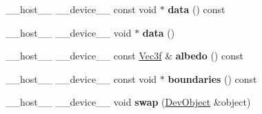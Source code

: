 \begin{DoxyCompactItemize}
\item 
\+\_\+\+\_\+host\+\_\+\+\_\+ \+\_\+\+\_\+device\+\_\+\+\_\+ const void $\ast$ {\bfseries data} () const\hypertarget{class_dev_object_a5533321471ee0ee776e30594ed48379f}{}\label{class_dev_object_a5533321471ee0ee776e30594ed48379f}

\item 
\+\_\+\+\_\+host\+\_\+\+\_\+ \+\_\+\+\_\+device\+\_\+\+\_\+ void $\ast$ {\bfseries data} ()\hypertarget{class_dev_object_a5335f7fb1dd5d15622aff5a8e9b0dc12}{}\label{class_dev_object_a5335f7fb1dd5d15622aff5a8e9b0dc12}

\item 
\+\_\+\+\_\+host\+\_\+\+\_\+ \+\_\+\+\_\+device\+\_\+\+\_\+ const \hyperlink{class_vec3}{Vec3f} \& {\bfseries albedo} () const\hypertarget{class_dev_object_ac4d2c0fc90a7be3085697e914bacc4d8}{}\label{class_dev_object_ac4d2c0fc90a7be3085697e914bacc4d8}

\item 
\+\_\+\+\_\+host\+\_\+\+\_\+ \+\_\+\+\_\+device\+\_\+\+\_\+ const void $\ast$ {\bfseries boundaries} () const\hypertarget{class_dev_object_a588ddd69ed74bc886b89fd4864024732}{}\label{class_dev_object_a588ddd69ed74bc886b89fd4864024732}

\item 
\+\_\+\+\_\+host\+\_\+\+\_\+ \+\_\+\+\_\+device\+\_\+\+\_\+ void {\bfseries swap} (\hyperlink{class_dev_object}{Dev\+Object} \&object)\hypertarget{class_dev_object_a56cf3cfc311cfe04da3b45f80e36625e}{}\label{class_dev_object_a56cf3cfc311cfe04da3b45f80e36625e}

\end{DoxyCompactItemize}

